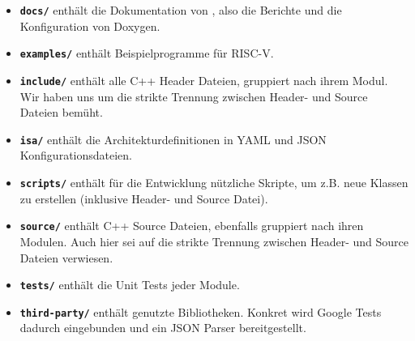 \begin{itemize}
	\item \textbf{\texttt{docs/}} enthält die Dokumentation von \erasim{}, also
	die Berichte und die Konfiguration von Doxygen.
	\item \textbf{\texttt{examples/}} enthält Beispielprogramme für RISC-V.
	\item \textbf{\texttt{include/}} enthält alle C++ Header Dateien, gruppiert
	nach ihrem Modul. Wir haben uns um die strikte Trennung zwischen Header- und
	Source Dateien bemüht.
	\item \textbf{\texttt{isa/}} enthält die Architekturdefinitionen in YAML und
	JSON Konfigurationsdateien.
	\item \textbf{\texttt{scripts/}} enthält für die Entwicklung nützliche
	Skripte, um z.B. neue Klassen zu erstellen (inklusive Header- und
	Source Datei).
	\item \textbf{\texttt{source/}} enthält C++ Source Dateien, ebenfalls
	gruppiert nach ihren Modulen. Auch hier sei auf die strikte Trennung
	zwischen Header- und Source Dateien verwiesen.
	\item \textbf{\texttt{tests/}} enthält die Unit Tests jeder Module.
	\item \textbf{\texttt{third-party/}} enthält genutzte Bibliotheken. Konkret
	wird Google Tests dadurch eingebunden und ein JSON Parser bereitgestellt.
\end{itemize}
